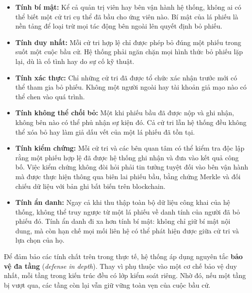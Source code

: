 \begin{itemize}
    \item \textbf{Tính bí mật:} Kể cả quản trị viên hay bên vận hành hệ thống, không ai có thể biết một cử tri cụ thể đã bầu cho ứng viên nào. Bí mật của lá phiếu là nền tảng để loại trừ mọi tác động bên ngoài lên quyết định bỏ phiếu.

    \item \textbf{Tính duy nhất:} Mỗi cử tri hợp lệ chỉ được phép bỏ đúng một phiếu trong suốt một cuộc bầu cử. Hệ thống phải ngăn chặn mọi hình thức bỏ phiếu lặp lại, dù là cố tình hay do sự cố kỹ thuật.

    \item \textbf{Tính xác thực:} Chỉ những cử tri đã được tổ chức xác nhận trước mới có thể tham gia bỏ phiếu. Không một người ngoài hay tài khoản giả mạo nào có thể chen vào quá trình.

    \item \textbf{Tính không thể chối bỏ:} Một khi phiếu bầu đã được nộp và ghi nhận, không bên nào có thể phủ nhận sự kiện đó. Cả cử tri lẫn hệ thống đều không thể xóa bỏ hay làm giả dấu vết của một lá phiếu đã tồn tại.

    \item \textbf{Tính kiểm chứng:} Mỗi cử tri và các bên quan tâm có thể kiểm tra độc lập rằng một phiếu hợp lệ đã được hệ thống ghi nhận và đưa vào kết quả công bố. Việc kiểm chứng không đòi hỏi phải tin tưởng tuyệt đối vào bên vận hành mà được thực hiện thông qua biên lai phiếu bầu, bằng chứng Merkle và đối chiếu dữ liệu với bản ghi bất biến trên blockchain.

    \item \textbf{Tính ẩn danh:} Ngay cả khi thu thập toàn bộ dữ liệu công khai của hệ thống, không thể truy ngược từ một lá phiếu về danh tính của người đã bỏ phiếu đó. Tính ẩn danh đi xa hơn tính bí mật: không chỉ giữ bí mật nội dung, mà còn hạn chế mọi mối liên hệ có thể phát hiện được giữa cử tri và lựa chọn của họ.
\end{itemize}

Để đảm bảo các tính chất trên trong thực tế, hệ thống áp dụng nguyên tắc \textbf{bảo vệ đa tầng} (\textit{defense in depth}). Thay vì phụ thuộc vào một cơ chế bảo vệ duy nhất, mỗi tầng trong kiến trúc đều có lớp kiểm soát riêng. Nhờ đó, nếu một tầng bị vượt qua, các tầng còn lại vẫn giữ vững toàn vẹn của cuộc bầu cử.

